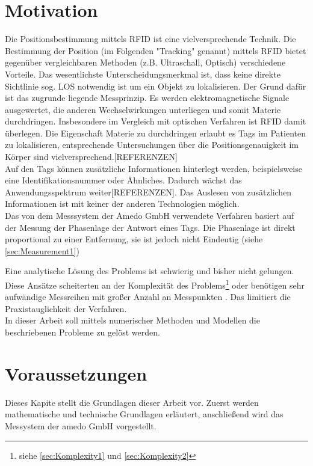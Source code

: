 \section[Motivation]{Motivation}
Die Positionsbestimmung mittels RFID ist eine vielversprechende Technik. Die Bestimmung der Position (im Folgenden "Tracking" genannt) mittels RFID  bietet gegenüber vergleichbaren Methoden (z.B. Ultraschall, Optisch) verschiedene Vorteile. Das wesentlichste Unterscheidungsmerkmal ist, dass keine direkte Sichtlinie sog. LOS notwendig ist um ein Objekt zu lokalisieren. Der Grund dafür ist das zugrunde liegende Messprinzip. Es werden elektromagnetische Signale ausgewertet, die anderen Wechselwirkungen unterliegen und somit Materie durchdringen. Insbesondere im Vergleich mit optischen Verfahren ist RFID damit überlegen. Die Eigenschaft Materie zu durchdringen erlaubt es Tags im Patienten zu lokalisieren, entsprechende Untersuchungen über die Positionsgenauigkeit im Körper sind vielversprechend.[REFERENZEN]\\
Auf den Tags können zusätzliche Informationen hinterlegt werden, beispielsweise eine Identifikationsnummer oder Ähnliches. Dadurch wächst das Anwendungsspektrum weiter[REFERENZEN]. Das Auslesen von zusätzlichen Informationen ist mit keiner der anderen Technologien möglich.\\
Das von dem Messsystem der {Amedo GmbH} verwendete Verfahren basiert auf der Messung der Phasenlage der Antwort eines Tags. Die Phasenlage ist direkt proportional zu einer Entfernung, sie ist jedoch nicht Eindeutig (siehe \ref{sec:Measurement1})

Eine analytische Lösung des Problems ist schwierig und bisher nicht gelungen. Diese Ansätze scheiterten an der Komplexität des Problems\footnote{siehe \ref{sec:Komplexity1} und \ref{sec:Komplexity2}} oder benötigen sehr aufwändige Messreihen mit großer Anzahl an Messpunkten \cite{amedo1}. Das limitiert die Praxistauglichkeit der Verfahren.\\
In dieser Arbeit soll mittels numerischer Methoden und Modellen die beschriebenen Probleme zu gelöst werden.
%
\section{Voraussetzungen}
%
Dieses Kapite stellt die Grundlagen dieser Arbeit vor. Zuerst werden mathematische und technische Grundlagen erläutert, anschließend wird das Messystem der amedo GmbH vorgestellt.
%

%
